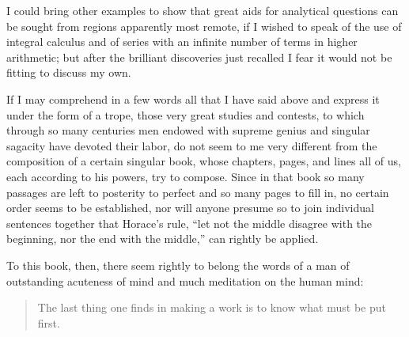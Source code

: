 \documentclass[11pt]{article}
\begin{document}
I could bring other examples to show that great aids for analytical questions can be sought from regions apparently most remote, if I wished to speak of the use of integral calculus and of series with an infinite number of terms in higher arithmetic; but after the brilliant discoveries just recalled I fear it would not be fitting to discuss my own.

If I may comprehend in a few words all that I have said above and express it under the form of a trope, those very great studies and contests, to which through so many centuries men endowed with supreme genius and singular sagacity have devoted their labor, do not seem to me very different from the composition of a certain singular book, whose chapters, pages, and lines all of us, each according to his powers, try to compose. Since in that book so many passages are left to posterity to perfect and so many pages to fill in, no certain order seems to be established, nor will anyone presume so to join individual sentences together that Horace's rule, ``let not the middle disagree with the beginning, nor the end with the middle,'' can rightly be applied.

To this book, then, there seem rightly to belong the words of a man of outstanding acuteness of mind and much meditation on the human mind:
\begin{quote}
The last thing one finds in making a work is to know what must be put first.
\end{quote}
\end{document}
